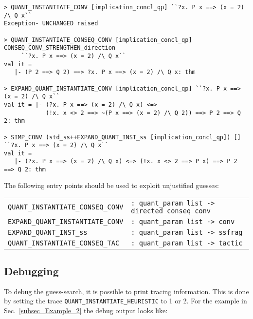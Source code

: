 \documentclass[a4paper,12pt,DIV=12,oneside]{scrbook}
\theoremstyle{definition}
\theoremstyle{remark}
\begin{document}
{\scriptsize
\begin{verbatim}
> QUANT_INSTANTIATE_CONV [implication_concl_qp] ``?x. P x ==> (x = 2) /\ Q x``
Exception- UNCHANGED raised

> QUANT_INSTANTIATE_CONSEQ_CONV [implication_concl_qp] CONSEQ_CONV_STRENGTHEN_direction 
     ``?x. P x ==> (x = 2) /\ Q x``
val it =
   |- (P 2 ==> Q 2) ==> ?x. P x ==> (x = 2) /\ Q x: thm

> EXPAND_QUANT_INSTANTIATE_CONV [implication_concl_qp] ``?x. P x ==> (x = 2) /\ Q x``
val it = |- (?x. P x ==> (x = 2) /\ Q x) <=>
            (!x. x <> 2 ==> ~(P x ==> (x = 2) /\ Q 2)) ==> P 2 ==> Q 2: thm

> SIMP_CONV (std_ss++EXPAND_QUANT_INST_ss [implication_concl_qp]) [] ``?x. P x ==> (x = 2) /\ Q x``
val it =
   |- (?x. P x ==> (x = 2) /\ Q x) <=> (!x. x <> 2 ==> P x) ==> P 2 ==> Q 2: thm
\end{verbatim}}


The following entry points should be used to exploit unjustified guesses:
\bigskip

\noindent
\begin{tabular}{@{}ll}
\texttt{QUANT\_INSTANTIATE\_CONSEQ\_CONV} & \texttt{: quant\_param list -> directed\_conseq\_conv} \\
\texttt{EXPAND\_QUANT\_INSTANTIATE\_CONV} & \texttt{: quant\_param list -> conv} \\
\texttt{EXPAND\_QUANT\_INST\_ss} & \texttt{: quant\_param list -> ssfrag} \\
\texttt{QUANT\_INSTANTIATE\_CONSEQ\_TAC} & \texttt{: quant\_param list -> tactic} 
\end{tabular}

\subsection{Debugging}

To debug the guess-search, it is possible to print tracing information. 
This is done by setting the trace \texttt{QUANT\_INSTANTIATE\_HEURISTIC} to 1 or 2. For
the example in Sec.~\ref{subsec_Example_2} the debug output looks like:
\end{document}
